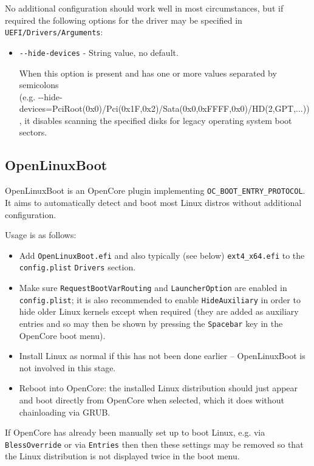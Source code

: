 \documentclass[]{article}
\providecommand{\tightlist}{%
  \setlength{\itemsep}{0pt}\setlength{\parskip}{0pt}}
\begin{document}
No additional configuration should work well in most circumstances, but if required the following
options for the driver may be specified in \texttt{UEFI/Drivers/Arguments}:

\begin{itemize}
  \tightlist
  \item \texttt{-{}-hide-devices} - String value, no default. \medskip

  When this option is present and has one or more values separated by semicolons \\
  (e.g. -{}-hide-devices=PciRoot(0x0)/Pci(0x1F,0x2)/Sata(0x0,0xFFFF,0x0)/HD(2,GPT,...)),
  it disables scanning the specified disks for legacy operating system boot sectors.\medskip
\end{itemize}

\subsection{OpenLinuxBoot}\label{uefilinux}

OpenLinuxBoot is an OpenCore plugin implementing \texttt{OC\_BOOT\_ENTRY\_PROTOCOL}.
It aims to automatically detect and boot most Linux distros without additional configuration.

Usage is as follows:

\begin{itemize}
\tightlist
  \item Add \texttt{OpenLinuxBoot.efi} and also typically (see below) \texttt{ext4\_x64.efi} to the \texttt{config.plist}
  \texttt{Drivers} section.
  \item Make sure \texttt{RequestBootVarRouting} and \texttt{LauncherOption} are enabled in \texttt{config.plist};
  it is also recommended to enable \texttt{HideAuxiliary} in order to hide older Linux kernels except when required
  (they are added as auxiliary entries and so may then be shown by pressing the \texttt{Spacebar} key in the OpenCore boot menu).
  \item Install Linux as normal if this has not been done earlier -- OpenLinuxBoot is not involved in this stage.
  \item Reboot into OpenCore: the installed Linux distribution should just appear and boot directly from OpenCore
  when selected, which it does without chainloading via GRUB.
\end{itemize}

If OpenCore has already been manually set up to boot Linux, e.g. via \texttt{BlessOverride} or via \texttt{Entries} then
then these settings may be removed so that the Linux distribution is not displayed twice in the boot menu.
\end{document}
